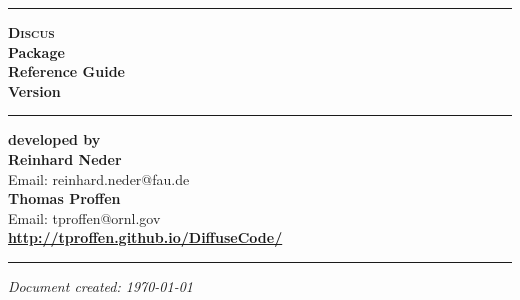 \documentclass[11pt]{report}
\newcommand{\discus}{\textsc{Discus}}
\begin{document}

\begin{titlepage}
\begin{flushright}

  \hrule
  \vspace{15mm}
  \textbf{{ \discus}} \\
  \vspace{5mm}
  \textbf{{ Package}} \\
  \vspace{10mm}
  \textbf{{\Huge Reference Guide}} \\
  \vspace{10mm}
  \textbf{{\Huge Version  \version}} \\
  \vspace{10mm}

  \hrule
  \vspace{45mm}
  \textbf{developed by} \\

  \vspace{5mm}
  \textbf{\Large Reinhard Neder} \\
  Email: reinhard.neder@fau.de \\

  \vspace{ 2mm}
  \textbf{\Large Thomas Proffen} \\
  Email: tproffen@ornl.gov \\

  \vspace{12mm}
  \textbf{\Large 
     \url{http://tproffen.github.io/DiffuseCode/} 
  } \\

  \vspace{3mm}
  \hrule
  \vspace{3mm}
 
  \textit{Document created: \today}
\end{flushright}

\end{titlepage}


\tableofcontents

\end{document}
